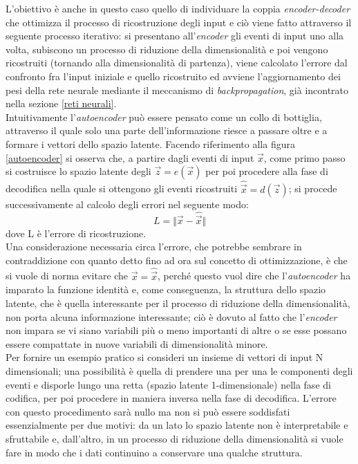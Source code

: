 L'obiettivo è anche in questo caso quello di individuare la coppia \textit{encoder-decoder} che ottimizza il processo di ricostruzione degli input e ciò viene fatto attraverso il seguente processo iterativo: si presentano all'\textit{encoder} gli eventi di input uno alla volta, subiscono un processo di riduzione della dimensionalità e poi vengono ricostruiti (tornando alla dimensionalità di partenza), viene calcolato l'errore dal confronto fra l'input iniziale e quello ricostruito ed avviene l'aggiornamento dei pesi della rete neurale mediante il meccanismo di \textit{backpropagation}, già incontrato nella sezione \ref{reti neurali}. \\
Intuitivamente l'\textit{autoencoder} può essere pensato come un collo di bottiglia, attraverso il quale solo una parte dell'informazione riesce a passare oltre e a formare i vettori dello spazio latente.
Facendo riferimento alla figura \ref{autoencoder} si osserva che, a partire dagli eventi di input $\vec{x}$, come primo passo si costruisce lo spazio latente degli $\vec{z} = e(\vec{x})$ per poi procedere alla fase di decodifica nella quale si ottengono gli eventi ricostruiti $\hat{\vec{x}} = d(\vec{z})$; si procede successivamente al calcolo degli errori nel seguente modo:
\begin{equation}
	L = \Vert \vec{x} - \hat{\vec{x}} \Vert
\end{equation}
dove L è l'errore di ricostruzione.\\
Una considerazione necessaria circa l'errore, che potrebbe sembrare in contraddizione con quanto detto fino ad ora sul concetto di ottimizzazione, è che si vuole di norma evitare che $\vec{x} = \hat{\vec{x}}$, perché questo vuol dire che l'\textit{autoencoder} ha imparato la funzione identità e, come conseguenza, la struttura dello spazio latente, che è quella interessante per il processo di riduzione della dimensionalità, non porta alcuna informazione interessante; ciò è dovuto al fatto che l'\textit{encoder} non impara se vi siano variabili più o meno importanti di altre o se esse possano essere compattate in nuove variabili di dimensionalità minore. \\
Per fornire un esempio pratico si consideri un insieme di vettori di input N dimensionali; una possibilità è quella di prendere una per una le componenti degli eventi e disporle lungo una retta (spazio latente 1-dimensionale) nella fase di codifica, per poi procedere in maniera inversa nella fase di decodifica. L'errore con questo procedimento sarà nullo ma non si può essere soddisfati essenzialmente per due motivi: da un lato lo spazio latente non è interpretabile e sfruttabile e, dall'altro, in un processo di riduzione della dimensionalità si vuole fare in modo che i dati continuino a conservare una qualche struttura. \\
